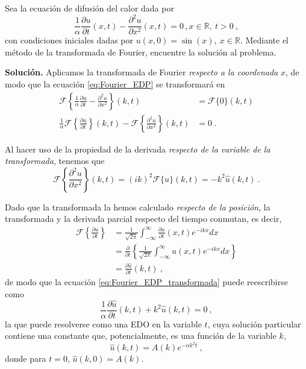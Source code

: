 \begin{ejemplo}
    Sea la ecuación de difusión del calor dada por
    \begin{equation} \label{eq:Fourier_EDP}
        \frac{1}{\alpha} \frac{\partial u}{\partial t} (x,t) - \frac{\partial^2 u}{\partial x^2}(x,t) = 0 \, , x \in \mathbb{R}, \ t>0 \ ,
    \end{equation}
    con condiciones iniciales dadas por $u(x,0) = \sin(x), \ x \in \mathbb{R}$. Mediante el método de la transformada de Fourier, encuentre la solución al problema.
    
    \textbf{Solución.} Aplicamos la transformada de Fourier \emph{respecto a la coordenada} $x$, de modo que la ecuación \eqref{eq:Fourier_EDP} se transformará en
    \begin{align}
        \mathcal{F}\left\{ \frac{1}{\alpha} \frac{\partial u}{\partial t} - \frac{\partial^2 u}{\partial x^2} \right\}(k, t) & = \mathcal{F}\{0\}(k,t) \nonumber \\
        \frac{1}{\alpha}\mathcal{F}\left\{ \frac{\partial u}{\partial t} \right\}(k, t) - \mathcal{F}\left\{ \frac{\partial^2 u}{\partial x^2} \right\}(k, t) & = 0 \ . \label{eq:Fourier_EDP_transformada}
    \end{align}

    Al hacer uso de la propiedad de la derivada \emph{respecto de la variable de la transformada}, tenemos que
    \begin{equation}
        \mathcal{F}\left\{ \frac{\partial^2 u}{\partial x^2} \right\}(k, t) = (ik)^2 \mathcal{F}\{u\}(k,t) = -k^2 \hat{u}(k,t) \ .
    \end{equation}
    
    Dado que la transformada la hemos calculado \emph{respecto de la posición}, la transformada y la derivada parcial respecto del tiempo conmutan, es decir,
    \begin{align}
        \mathcal{F} \left\{ \frac{\partial u}{\partial t} \right\} & = \frac{1}{\sqrt{2\pi}} \int_{-\infty}^\infty \frac{\partial u}{\partial t} (x,t) e^{-ikx} dx \nonumber \\
        & = \frac{\partial }{\partial t} \left\{ \frac{1}{\sqrt{2\pi}} \int_{-\infty}^\infty u(x,t) e^{-ikx} dx  \right\} \nonumber \\
        & = \frac{\partial \hat{u}}{\partial t}(k,t) \ ,
    \end{align}
    de modo que la ecuación \eqref{eq:Fourier_EDP_transformada} puede reescribirse como
    \begin{equation} \label{eq:EDP_fourier_reducida}
        \frac{1}{\alpha} \frac{\partial \hat{u}}{\partial t}(k,t) + k^2 \hat{u}(k,t) = 0 \ ,
    \end{equation}
    la que puede resolverse como una EDO en la variable $t$, cuya solución particular contiene una constante que, potencialmente, es una función de la variable $k$,
    \begin{equation} \label{eq:solucion_en_fourier}
        \hat{u}(k,t) = A(k) e^{-\alpha k^2 t} \ ,
    \end{equation}
    donde para $t=0$, $\hat{u}(k,0) = A(k)$.


\end{ejemplo}
